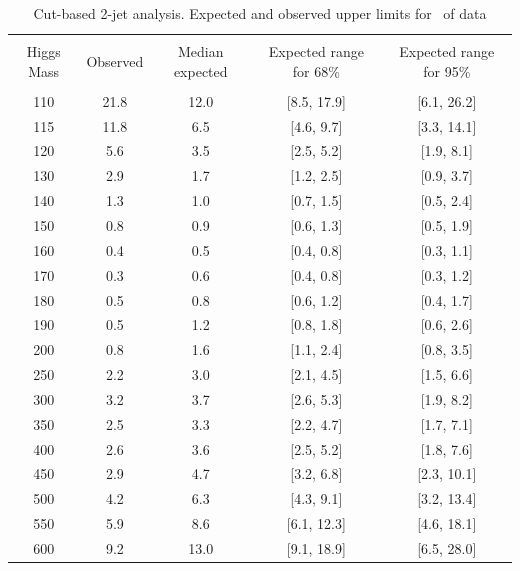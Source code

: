 \begin{table}[!hbp]
\begin{center}
\begin{tabular}{c c c c c}
\hline
\vspace{-3mm} && \\
Higgs Mass & Observed & Median expected & Expected range for 68\% & Expected range for 95\%   \\
\vspace{-3mm} && \\
\hline
110 & 21.8 & 12.0 & [8.5, 17.9] & [6.1, 26.2] \\
115 & 11.8 & 6.5 & [4.6, 9.7] & [3.3, 14.1] \\
120 & 5.6 & 3.5 & [2.5, 5.2] & [1.9, 8.1] \\
130 & 2.9 & 1.7 & [1.2, 2.5] & [0.9, 3.7] \\
140 & 1.3 & 1.0 & [0.7, 1.5] & [0.5, 2.4] \\
150 & 0.8 & 0.9 & [0.6, 1.3] & [0.5, 1.9] \\
160 & 0.4 & 0.5 & [0.4, 0.8] & [0.3, 1.1] \\
170 & 0.3 & 0.6 & [0.4, 0.8] & [0.3, 1.2] \\
180 & 0.5 & 0.8 & [0.6, 1.2] & [0.4, 1.7] \\
190 & 0.5 & 1.2 & [0.8, 1.8] & [0.6, 2.6] \\
200 & 0.8 & 1.6 & [1.1, 2.4] & [0.8, 3.5] \\
250 & 2.2 & 3.0 & [2.1, 4.5] & [1.5, 6.6] \\
300 & 3.2 & 3.7 & [2.6, 5.3] & [1.9, 8.2] \\
350 & 2.5 & 3.3 & [2.2, 4.7] & [1.7, 7.1] \\
400 & 2.6 & 3.6 & [2.5, 5.2] & [1.8, 7.6] \\
450 & 2.9 & 4.7 & [3.2, 6.8] & [2.3, 10.1] \\
500 & 4.2 & 6.3 & [4.3, 9.1] & [3.2, 13.4] \\
550 & 5.9 & 8.6 & [6.1, 12.3] & [4.6, 18.1] \\
600 & 9.2 & 13.0 & [9.1, 18.9] & [6.5, 28.0] \\
\hline
\end{tabular}
\caption{Cut-based 2-jet analysis. Expected and observed
  upper limits for \intlumi\ of data}
\label{tab:vbf_cut}
\end{center}
\end{table}

